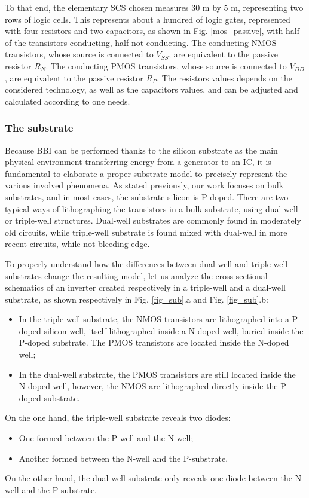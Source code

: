 		
		To that end, the elementary SCS chosen measures 30 \textmu m by 5 \textmu m, representing two rows of logic cells.
		This represents about a hundred of logic gates, represented with four resistors and two capacitors, as shown in Fig. \ref{mos_passive}, with half of the transistors conducting, half not conducting.
		The conducting NMOS transistors, whose source is connected to $V_{SS}$, are equivalent to the passive resistor $R_N$.
		The conducting PMOS transistors, whose source is connected to $V_{DD}$, are equivalent to the passive resistor $R_P$.
		The resistors values depends on the considered technology, as well as the capacitors values, and can be adjusted and calculated according to one needs.

	\subsubsection{The substrate}
		
		Because BBI can be performed thanks to the silicon substrate as the main physical environment transferring energy from a generator to an IC, it is fundamental to elaborate a proper substrate model to precisely represent the various involved phenomena.
		As stated previously, our work focuses on bulk substrates, and in most cases, the substrate silicon is P-doped.
		There are two typical ways of lithographing the transistors in a bulk substrate, using dual-well or triple-well structures.
		Dual-well substrates are commonly found in moderately old circuits, while triple-well substrate is found mixed with dual-well in more recent circuits, while not bleeding-edge.

		To properly understand how the differences between dual-well and triple-well substrates change the resulting model, let us analyze the cross-sectional schematics of an inverter created respectively in a triple-well and a dual-well substrate, as shown respectively in Fig. \ref{fig_sub}.a and Fig. \ref{fig_sub}.b:
		\begin{itemize}
			\item In the triple-well substrate, the NMOS transistors are lithographed into a P-doped silicon well, itself lithographed inside a N-doped well, buried inside the P-doped substrate. The PMOS transistors are located inside the N-doped well;
			\item In the dual-well substrate, the PMOS transistors are still located inside the N-doped well, however, the NMOS are lithographed directly inside the P-doped substrate.
		\end{itemize}
		On the one hand, the triple-well substrate reveals two diodes:
		\begin{itemize}
			\item One formed between the P-well and the N-well;
			\item Another formed between the N-well and the P-substrate.
		\end{itemize}
		On the other hand, the dual-well substrate only reveals one diode between the N-well and the P-substrate.


